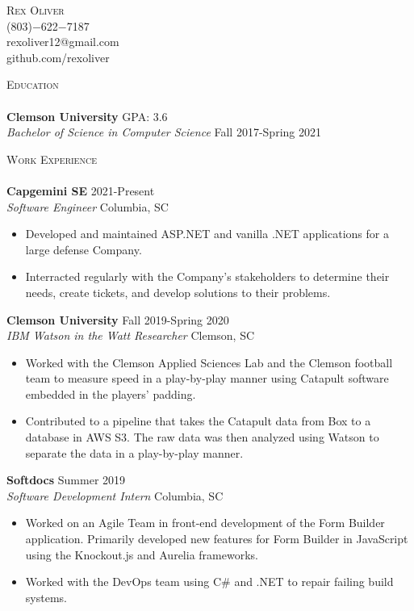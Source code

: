 \documentclass[a4paper]{article}
\newcommand{\lineunder} {
    \vspace*{-8pt} \\
    \hspace*{-18pt} \hrulefill \\
}
\newcommand{\header} [1] {
    {\hspace*{-18pt}\vspace*{6pt} \textsc{#1}}
    \vspace*{-6pt} \lineunder
}
\newcommand{\contact} [4] {
    \vspace*{-10pt}
    \begin{center}
        {\huge \scshape {#1}}\\
        #2 \\ #3 \\ #4
    \end{center}
    \vspace*{-8pt}
}
\newcommand{\beginninglist} [4] {
	
	\noindent \textbf{#1} \hfill \hfill #3\\ \noindent \textit{#2} \hfill \hfill #4 \\    
}
\begin{document}
\vspace*{-40pt}

\contact {Rex Oliver}{(803)$-$622$-$7187}{rexoliver12@gmail.com}{github.com/rexoliver}

\header {Education}
\beginninglist {Clemson University} {Bachelor of Science in Computer Science} {GPA: 3.6} {Fall 2017-Spring 2021} \vspace{3pt}

\header {Work Experience}
\beginninglist {Capgemini SE} {Software Engineer} {2021-Present} {Columbia, SC} \vspace{-8pt}
\begin{itemize}
	\item Developed and maintained ASP.NET and vanilla .NET applications for a large defense Company. \vspace{-5pt}
	\item Interracted regularly with the Company's stakeholders to determine their needs, create tickets, and develop solutions to their problems.  \vspace{-5pt}
\end{itemize}
\beginninglist {Clemson University} {IBM Watson in the Watt Researcher} {Fall 2019-Spring 2020} {Clemson, SC} \vspace{-8pt}
\begin{itemize}
	\item Worked with the Clemson Applied Sciences Lab and the Clemson football team to measure speed in a play-by-play manner using Catapult software embedded in the players' padding. \vspace{-5pt}
	\item Contributed to a pipeline that takes the Catapult data from Box to a database in AWS S3. The raw data was then analyzed using Watson to separate the data in a play-by-play manner. \vspace{-5pt}
\end{itemize}	
\beginninglist {Softdocs} {Software Development Intern} {Summer 2019} {Columbia, SC} \vspace{-8pt}
\begin{itemize}
	\item Worked on an Agile Team in front-end development of the Form Builder application. Primarily developed new features for Form Builder in JavaScript using the Knockout.js and Aurelia frameworks. \vspace{-5pt}
	\item Worked with the DevOps team using C\# and .NET to repair failing build systems. \vspace{-5pt}
\end{itemize}	
\end{document}
